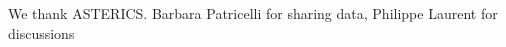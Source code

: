\documentclass[a0,portrait]{a0poster}
\begin{document}
\begin{multicols}{2}

\cite{*}


\vspace{10mm}

{\footnotesize 
  We thank ASTERICS. Barbara Patricelli for sharing data, Philippe Laurent for discussions}




\end{multicols}
\end{document}
